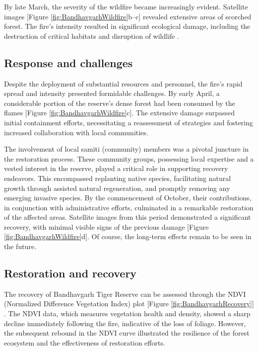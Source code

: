\documentclass[
  12 pt,
]{Nemilov}
\begin{document}
By late March, the severity of the wildfire became increasingly evident. Satellite images {[}Figure \ref{fig:BandhavgarhWildfire}b--c{]} revealed extensive areas of scorched forest. The fire's intensity resulted in significant ecological damage, including the destruction of critical habitats and disruption of wildlife \citep{banerjee2024vegetation}.

\subsection{Response and challenges}\label{response-and-challenges}

Despite the deployment of substantial resources and personnel, the fire's rapid spread and intensity presented formidable challenges. By early April, a considerable portion of the reserve's dense forest had been consumed by the flames {[}Figure \ref{fig:BandhavgarhWildfire}c{]}. The extensive damage surpassed initial containment efforts, necessitating a reassessment of strategies and fostering increased collaboration with local communities.

The involvement of local samiti (community) members was a pivotal juncture in the restoration process. These community groups, possessing local expertise and a vested interest in the reserve, played a critical role in supporting recovery endeavors. This encompassed replanting native species, facilitating natural growth through assisted natural regeneration, and promptly removing any emerging invasive species. By the commencement of October, their contributions, in conjunction with administrative efforts, culminated in a remarkable restoration of the affected areas. Satellite images from this period demonstrated a significant recovery, with minimal visible signs of the previous damage {[}Figure \ref{fig:BandhavgarhWildfire}d{]}. Of course, the long-term effects remain to be seen in the future.

\subsection{Restoration and recovery}\label{restoration-and-recovery}

The recovery of Bandhavgarh Tiger Reserve can be assessed through the NDVI (Normalized Difference Vegetation Index) plot {[}Figure \ref{fig:BandhavgarhRecovery}{]} \citep{singh2024quantifying}. The NDVI data, which measures vegetation health and density, showed a sharp decline immediately following the fire, indicative of the loss of foliage. However, the subsequent rebound in the NDVI curve illustrated the resilience of the forest ecosystem and the effectiveness of restoration efforts.
\end{document}
